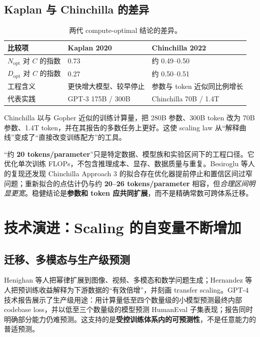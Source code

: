 \documentclass[UTF8,10pt,a4paper,fontset=none]{ctexart}
\newcommand{\term}[1]{\textbf{#1}}
\begin{document}
\subsection{Kaplan 与 Chinchilla 的差异}

\begin{table}[htbp]
\centering
\caption{两代 compute-optimal 结论的差异。}
\label{zh:tab:kaplan-chinchilla}
\begin{tabularx}{\textwidth}{Y C{3.2cm} C{3.2cm}}
\toprule
比较项 & Kaplan 2020 & Chinchilla 2022 \\
\midrule
$N_{\mathrm{opt}}$ 对 $C$ 的指数 & 0.73 & 约 0.49--0.50 \\
$D_{\mathrm{opt}}$ 对 $C$ 的指数 & 0.27 & 约 0.50--0.51 \\
工程含义 & 更快增大模型、较早停止 & 参数与 token 近似同比例增长 \\
代表实践 & GPT-3 175B / 300B & Chinchilla 70B / 1.4T \\
\bottomrule
\end{tabularx}
\end{table}

Chinchilla 以与 Gopher 近似的训练计算量，把 280B 参数、300B token 改为 70B 参数、1.4T token，并在其报告的多数任务上更好\cite{zh:rae2021,zh:hoffmann2022}。这使 scaling law 从“解释曲线”变成了“直接改变训练配方”的工具。

“约 \textbf{20 tokens/parameter}”只是特定数据、模型族和实验区间下的工程口径。它优化单次训练 FLOPs，不包含推理成本、显存、数据质量与重复。Besiroglu 等人的复现还发现 Chinchilla Approach 3 的拟合存在优化器提前停止和置信区间过窄问题；重新拟合的点估计仍与约 \textbf{20--26 tokens/parameter} 相容，但\textit{合理区间明显更宽}\cite{zh:besiroglu2024}。稳健结论是\term{参数和 token 应共同扩展}，而不是精确常数可跨体系迁移。

\section{技术演进：Scaling 的自变量不断增加}

\subsection{迁移、多模态与生产级预测}

Henighan 等人把幂律扩展到图像、视频、多模态和数学问题生成\cite{zh:henighan2020}；Hernandez 等人把预训练收益解释为下游数据的“有效倍增”，并刻画 transfer scaling\cite{zh:hernandez2021}。GPT-4 技术报告展示了生产级用途：用计算量低至四个数量级的小模型预测最终内部 codebase loss，并以低至三个数量级的模型预测 HumanEval 子集表现；报告同时明确部分能力仍难预测\cite{zh:openai2023gpt4}。这支持的是\term{受控训练体系内的可预测性}，不是任意能力的普适预测。
\end{document}
